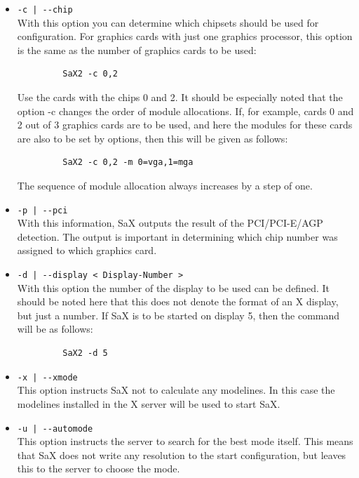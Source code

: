 \begin{itemize}
\item \verb+-c | --chip+\\
      With this option you can determine which chipsets should be used for
      configuration. For graphics cards with just one graphics processor,
      this option is the same as the number of graphics cards to be
      used:
      \begin{verbatim}
         SaX2 -c 0,2
      \end{verbatim}
      Use the cards with the chips 0 and 2. It should be especially noted that
      the option -c changes the order of module allocations. If, for example,
      cards 0 and 2 out of 3 graphics cards are to be used, and here the
      modules for these cards are also to be set by options, then this will be
      given as follows: 
      \begin{verbatim} 
         SaX2 -c 0,2 -m 0=vga,1=mga
      \end{verbatim}
      The sequence of module allocation always increases by a step of one.

\item \verb+-p | --pci+\\
      With this information, SaX outputs the result of the PCI/PCI-E/AGP
      detection. The output is important in determining which chip number
      was assigned to which graphics card.

\item \verb+-d | --display < Display-Number >+\\
      With this option the number of the display to be used can be defined. It
      should be noted here that this does not denote the format of an X
      display, but just a number. If SaX is to be started on display 5, then
      the command will be as follows:
      \begin{verbatim} 
         SaX2 -d 5
      \end{verbatim} 
      
\item \verb+-x | --xmode+\\
      This option instructs SaX not to calculate any modelines. In 
      this case the modelines installed in the X server will be used to start
      SaX.

\item \verb+-u | --automode+\\
      This option instructs the server to search for the best mode
      itself. This means that SaX does not write any resolution to the start
      configuration, but leaves this to the server to choose the mode.


\end{itemize}
